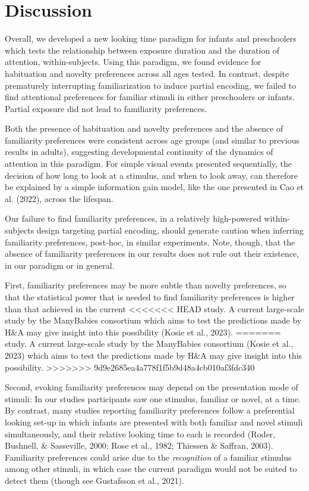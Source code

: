 \documentclass[10pt, letterpaper]{article}
\begin{document}
\hypertarget{discussion}{%
\section{Discussion}\label{discussion}}

Overall, we developed a new looking time paradigm for infants and
preschoolers which tests the relationship between exposure duration and
the duration of attention, within-subjects. Using this paradigm, we
found evidence for habituation and novelty preferences across all ages
tested. In contrast, despite prematurely interrupting familiarization to
induce partial encoding, we failed to find attentional preferences for
familiar stimuli in either preschoolers or infants. Partial exposure did
not lead to familiarity preferences.

Both the presence of habituation and novelty preferences and the absence
of familiarity preferences were consistent across age groups (and
similar to previous results in adults), suggesting developmental
continuity of the dynamics of attention in this paradigm. For simple
visual events presented sequentially, the decision of how long to look
at a stimulus, and when to look away, can therefore be explained by a
simple information gain model, like the one presented in Cao et al.
(2022), across the lifespan.

Our failure to find familiarity preferences, in a relatively
high-powered within-subjects design targeting partial encoding, should
generate caution when inferring familiarity preferences, post-hoc, in
similar experiments. Note, though, that the absence of familiarity
preferences in our results does not rule out their existence, in our
paradigm or in general.

First, familiarity preferences may be more subtle than novelty
preferences, so that the statistical power that is needed to find
familiarity preferences is higher than that achieved in the current
<<<<<<< HEAD
study. A current large-scale study by the ManyBabies consortium which
aims to test the predictions made by H\&A may give insight into this
possibility (Kosie et al., 2023).
=======
study. A current large-scale study by the ManyBabies consortium (Kosie
et al., 2023) which aims to test the predictions made by H\&A may give
insight into this possibility.
>>>>>>> 9d9e2685ea4a778f1f5b9d48a4cb010af3fdc340

Second, evoking familiarity preferences may depend on the presentation
mode of stimuli: In our studies participants saw one stimulus, familiar
or novel, at a time. By contrast, many studies reporting familiarity
preferences follow a preferential looking set-up in which infants are
presented with both familiar and novel stimuli simultaneously, and their
relative looking time to each is recorded (Roder, Bushnell, \&
Sasseville, 2000; Rose et al., 1982; Thiessen \& Saffran, 2003).
Familiarity preferences could arise due to the \emph{recognition} of a
familiar stimulus among other stimuli, in which case the current
paradigm would not be suited to detect them (though see Gustafsson et
al., 2021).
\end{document}
